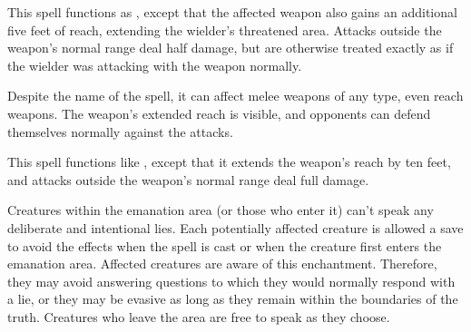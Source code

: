 \spelldur{\durshort}
\begin{spelleffect}
  This spell functions as , except that the affected weapon also gains an additional five feet of reach, extending the wielder's threatened area. Attacks outside the weapon's normal range deal half damage, but are otherwise treated exactly as if the wielder was attacking with the weapon normally.
\end{spelleffect}
\begin{spellnotes}
  Despite the name of the spell, it can affect melee weapons of any type, even reach weapons. The weapon's extended reach is visible, and opponents can defend themselves normally against the attacks.
\end{spellnotes}

\begin{spelleffect}
  This spell functions like , except that it extends the weapon's reach by ten feet, and attacks outside the weapon's normal range deal full damage.
\end{spelleffect}

\spellrng{\rngmed}
\spelldur{\durmed}
\begin{spelleffect}
  Creatures within the emanation area (or those who enter it) can't speak any deliberate and intentional lies. Each potentially affected creature is allowed a save to avoid the effects when the spell is cast or when the creature first enters the emanation area. Affected creatures are aware of this enchantment. Therefore, they may avoid answering questions to which they would normally respond with a lie, or they may be evasive as long as they remain within the boundaries of the truth. Creatures who leave the area are free to speak as they choose.
\end{spelleffect}
